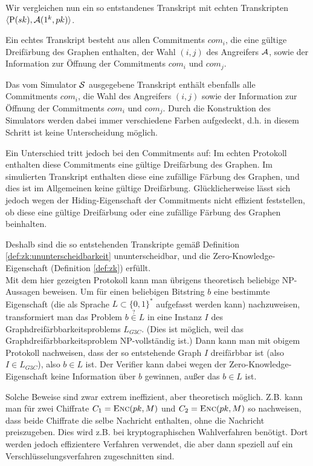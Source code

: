 Wir vergleichen nun ein so entstandenes Transkript mit echten Transkripten $\langle \mathrm{P}(sk), \mathcal{A}(1^k, pk) \rangle$.

Ein echtes Transkript besteht aus allen Commitments $com_i$, die eine gültige Dreifärbung des Graphen enthalten, der Wahl $(i,j)$ des Angreifers $\mathcal{A}$, sowie der Information zur Öffnung der Commitments $com_i$ und $com_j$.

Das vom Simulator $\mathcal{S}$ ausgegebene Transkript enthält ebenfalls alle Commitments $com_i$, die Wahl des Angreifers $(i,j)$ sowie der Information zur Öffnung der Commitments $com_i$ und $com_j$. Durch die Konstruktion des Simulators werden dabei immer verschiedene Farben aufgedeckt, d.h. in diesem Schritt ist keine Unterscheidung möglich.

Ein Unterschied tritt jedoch bei den Commitments auf: Im echten Protokoll enthalten diese Commitments eine gültige Dreifärbung des Graphen. Im simulierten Transkript enthalten diese eine zufällige Färbung des Graphen, und dies ist im Allgemeinen keine gültige Dreifärbung.
Glücklicherweise lässt sich jedoch wegen der Hiding-Eigenschaft der Commitments nicht effizient feststellen, ob diese eine gültige Dreifärbung oder eine zufällige Färbung des Graphen beinhalten.

Deshalb sind die so entstehenden Transkripte gemäß Definition \ref{def:zk:ununterscheidbarkeit} ununterscheidbar, und die Zero-Knowledge-Eigenschaft (Definition \ref{def:zk}) erfüllt.\\

Mit dem hier gezeigten Protokoll kann man übrigens theoretisch beliebige NP-Aussagen beweisen.
Um für einen beliebigen Bitstring $b$ eine bestimmte Eigenschaft (die als Sprache $L \subset \{0,1\}^*$ aufgefasst werden kann) nachzuweisen, transformiert man das Problem $b \stackrel{?}{\in} L$ in eine Instanz $I$ des Graphdreifärbbarkeitsproblems $L_{G3C}$.
(Dies ist möglich, weil das Graphdreifärbbarkeitsproblem NP-vollständig ist.)
Dann kann man mit obigem Protokoll nachweisen, dass der so entstehende Graph $I$ dreifärbbar ist (also $I \in L_{G3C}$), also $b \in L$ ist.
Der Verifier kann dabei wegen der Zero-Knowledge-Eigenschaft keine Information über $b$ gewinnen, außer das $b \in L$ ist.

Solche Beweise sind zwar extrem ineffizient, aber theoretisch möglich.
Z.B. kann man für zwei Chiffrate $C_1 = \textsc{Enc}(pk, M)$ und $C_2 = \textsc{Enc}(pk, M)$ so nachweisen, dass beide Chiffrate die selbe Nachricht enthalten, ohne die Nachricht preiszugeben.
Dies wird z.B. bei kryptographischen Wahlverfahren benötigt.
Dort werden jedoch effizientere Verfahren verwendet, die aber dann speziell auf ein Verschlüsselungsverfahren zugeschnitten sind.

